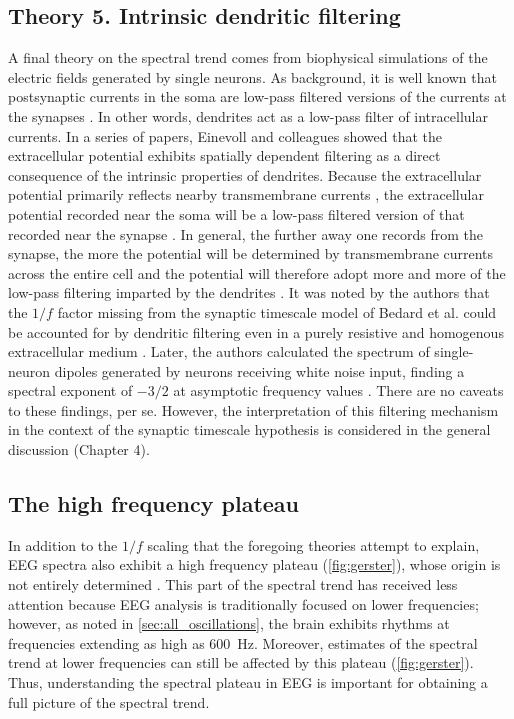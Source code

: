 \subsection{Theory 5. Intrinsic dendritic filtering}
A final theory on the spectral trend comes from biophysical simulations of the electric fields generated by single neurons. As background, it is well known that postsynaptic currents in the soma are low-pass filtered versions of the currents at the synapses \cite{Rall1967}. In other words, dendrites act as a low-pass filter of intracellular currents. In a series of papers, Einevoll and colleagues showed that the extracellular potential exhibits spatially dependent filtering as a direct consequence of the intrinsic properties of dendrites. Because the extracellular potential primarily reflects nearby transmembrane currents \cite{Nunez2006}, the extracellular potential recorded near the soma will be a low-pass filtered version of that recorded near the synapse \cite{Linden2010}. In general, the further away one records from the synapse, the more the potential will be determined by transmembrane currents across the entire cell and the potential will therefore adopt more and more of the low-pass filtering imparted by the dendrites \cite{Linden2010}. It was noted by the authors that the $1/f$ factor missing from the synaptic timescale model of Bedard et al. \cite{Bedard2006} could be accounted for by dendritic filtering even in a purely resistive and homogenous extracellular medium \cite{Linden2010,Pettersen2008}. Later, the authors calculated the spectrum of single-neuron dipoles generated by neurons receiving white noise input, finding a spectral exponent of $-3/2$ at asymptotic frequency values \cite{Pettersen2014}. There are no caveats to these findings, per se. However, the interpretation of this filtering mechanism in the context of the synaptic timescale hypothesis is considered in the general discussion (Chapter 4). 

\subsection{The high frequency plateau} \label{sec:plateau}
In addition to the $1/f$ scaling that the foregoing theories attempt to explain, EEG spectra also exhibit a high frequency plateau (\autoref{fig:gerster}), whose origin is not entirely determined \cite{Gerster2022}. This part of the spectral trend has received less attention because EEG analysis is traditionally focused on lower frequencies; however, as noted in \autoref{sec:all_oscillations}, the brain exhibits rhythms at frequencies extending as high as \qty{600}{\hertz}. Moreover, estimates of the spectral trend at lower frequencies can still be affected by this plateau (\autoref{fig:gerster}). Thus, understanding the spectral plateau in EEG is important for obtaining a full picture of the spectral trend. 

